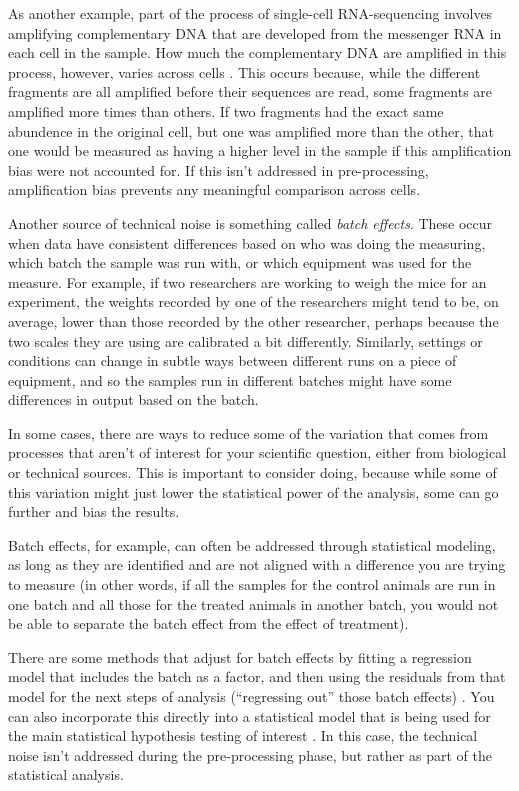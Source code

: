 \documentclass[]{tufte-book}
\begin{document}
As another example, part of the process of single-cell RNA-sequencing involves
amplifying complementary DNA that are developed from the messenger RNA in each
cell in the sample. How much the complementary DNA are amplified in this
process, however, varies across cells \citep{perkel2017single}. This occurs because,
while the different fragments are all amplified before their sequences are read,
some fragments are amplified more times than others. If two fragments had the
exact same abundence in the original cell, but one was amplified more than the
other, that one would be measured as having a higher level in the sample if this
amplification bias were not accounted for. If this isn't addressed in
pre-processing, amplification bias prevents any meaningful comparison
across cells.

Another source of technical noise is something called \emph{batch effects}. These
occur when data have consistent differences based on who was doing the
measuring, which batch the sample was run with, or which equipment was used for
the measure. For example, if two researchers are working to weigh the mice for
an experiment, the weights recorded by one of the researchers might tend to be,
on average, lower than those recorded by the other researcher, perhaps because
the two scales they are using are calibrated a bit differently. Similarly,
settings or conditions can change in subtle ways between different runs on a
piece of equipment, and so the samples run in different batches might have some
differences in output based on the batch.

In some cases, there are ways to reduce some of the variation that comes from
processes that aren't of interest for your scientific question, either from
biological or technical sources. This is important to consider doing, because
while some of this variation might just lower the statistical power of the
analysis, some can go further and bias the results.

Batch effects, for example, can often be addressed through statistical modeling,
as long as they are identified and are not aligned with a difference you are
trying to measure (in other words, if all the samples for the control animals
are run in one batch and all those for the treated animals in another batch, you
would not be able to separate the batch effect from the effect of treatment).

There are some methods that adjust for batch effects by fitting a regression
model that includes the batch as a factor, and then using the residuals from
that model for the next steps of analysis (``regressing out'' those batch effects)
\citep{mccarthy2017scater}. You can also incorporate this directly into a statistical
model that is being used for the main statistical hypothesis testing of interest
\citep{mccarthy2017scater}. In this case, the technical noise isn't addressed
during the pre-processing phase, but rather as part of the statistical analysis.
\end{document}
